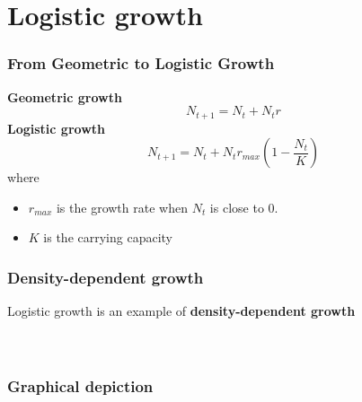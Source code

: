 \documentclass[color=usenames,dvipsnames]{beamer}\usepackage[]{graphicx}\usepackage[]{color}
\begin{document}
\section{Logistic growth}


\begin{frame}
  \frametitle{From Geometric to Logistic Growth}
  \large
  {\bf Geometric growth}
  \[
    N_{t+1} = N_t + N_tr
  \]
  \pause
  {\bf Logistic growth}
  \[
    N_{t+1} = N_t + N_t r_{max}\left(1 - \frac{N_t}{K}\right)
  \]
  where \\
  \begin{itemize}
    \item $r_{max}$ is the growth rate when $N_t$ is close to 0. \\
    \item $K$ is the carrying capacity
  \end{itemize}
\end{frame}








\begin{frame}
  \frametitle{Density-dependent growth}
  \large
  Logistic growth is an example of {\bf density-dependent
    growth} \\
  \vspace{0.5cm}
   \\
  \vspace{0.5cm}
   \\
\end{frame}




\begin{frame}[fragile]
  \frametitle{Graphical depiction}




\vspace{-1cm}
\begin{center}
\end{center}
\end{frame}
\end{document}

